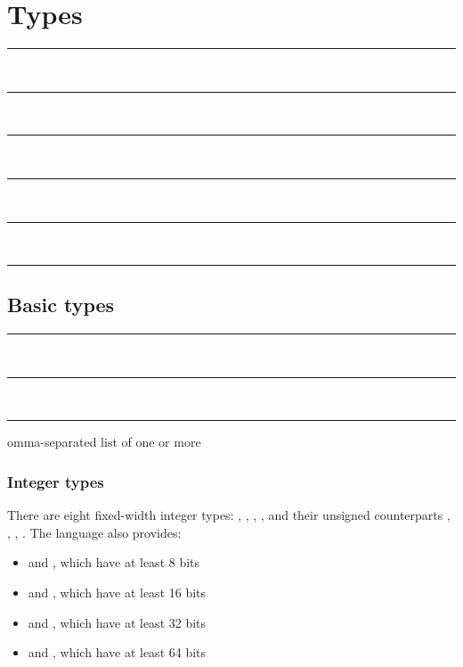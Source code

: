 
\chapter{Types}

\begin{grammar}
\rule{type} \\
\rule{type} \\
\rule{type} \\
\rule{type} \\
\rule{type} \\
\rule{type} 
\end{grammar}

\section{Basic types}

\begin{grammar}
\rule{basic-type} \\
\rule{basic-type}  \code{<}  \code{>}\\
\rule{generic-argument-list} comma-separated list of one or more 
\end{grammar}

\subsection{Integer types}

There are eight fixed-width integer types: , ,
, , and their unsigned counterparts ,
, , . The language also provides:

\begin{itemize}
\item {} and , which have at least 8 bits
\item {} and , which have at least 16 bits
\item {} and , which have at least 32 bits
\item {} and , which have at least 64 bits
\end{itemize}

